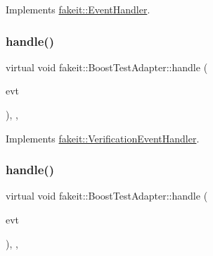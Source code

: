 Implements \mbox{\hyperlink{structfakeit_1_1EventHandler_a4de5ad05e5de73e36f4b2cede6d8efd3}{fakeit\+::\+Event\+Handler}}.

\mbox{\label{structfakeit_1_1BoostTestAdapter_a8ba1497e33a41a7927668860f56295b6}} 
\subsubsection{\texorpdfstring{handle()}{handle()}\hspace{0.1cm}{\footnotesize\ttfamily [2/6]}}
{\footnotesize\ttfamily virtual void fakeit\+::\+Boost\+Test\+Adapter\+::handle (\begin{DoxyParamCaption}\item[{const \mbox{\hyperlink{structfakeit_1_1SequenceVerificationEvent}{Sequence\+Verification\+Event}} \&}]{evt }\end{DoxyParamCaption})\hspace{0.3cm}{\ttfamily [inline]}, {\ttfamily [override]}, {\ttfamily [virtual]}}



Implements \mbox{\hyperlink{structfakeit_1_1VerificationEventHandler_adf355a9888bc2bf78ce0e1219bfb1379}{fakeit\+::\+Verification\+Event\+Handler}}.

\mbox{\label{structfakeit_1_1BoostTestAdapter_aef1bc4f059166c4e403bdb1d31b68fc5}} 
\subsubsection{\texorpdfstring{handle()}{handle()}\hspace{0.1cm}{\footnotesize\ttfamily [3/6]}}
{\footnotesize\ttfamily virtual void fakeit\+::\+Boost\+Test\+Adapter\+::handle (\begin{DoxyParamCaption}\item[{const \mbox{\hyperlink{structfakeit_1_1NoMoreInvocationsVerificationEvent}{No\+More\+Invocations\+Verification\+Event}} \&}]{evt }\end{DoxyParamCaption})\hspace{0.3cm}{\ttfamily [inline]}, {\ttfamily [override]}, {\ttfamily [virtual]}}



